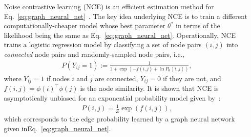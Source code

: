 \documentclass{article}
\theoremstyle{plain}
\theoremstyle{definition}
\theoremstyle{remark}
\begin{document}
Noise contrastive learning (NCE) is an efficient estimation method for Eq.~\eqref{eq:graph_neural_net}~\cite{Gutmann2010}. 
The key idea underlying NCE is to train a different computationally-cheaper model whose best parameter $\theta^*$ in terms of the likelihood being the same as Eq.~\eqref{eq:graph_neural_net}.
Operationally, NCE trains a logistic regression model by classifying a set of node pairs $(i,j)$ into \textit{connected} node pairs and randomly-sampled node pairs, i.e.,  
\begin{align}
P\left(Y_{ij} = 1\right):= \frac{1}{1 + \exp(-f(i,j) + \ln P_0(i,j))},
\label{eq:nce}
\end{align}
where $Y_{ij} = 1$ if nodes $i$ and $j$ are connected, $Y_{ij}=0$ if they are not, and $f(i,j)=\phi(i) ^\top \phi(j)$ is the node similarity. 
It is shown that NCE is asymptotically unbiased for an exponential probability model given by~\cite{Gutmann2010,dyer2014}:
\begin{align}
P(i,j) = \frac{1}{Z}\exp(f(i,j)), \label{eq:exp_func}
\end{align}
which corresponds to the edge probability learned by a graph neural network given inEq.~\eqref{eq:graph_neural_net}.
\end{document}
